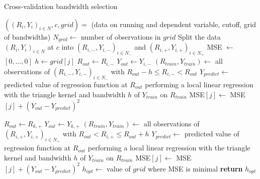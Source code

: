 \documentclass[11pt, a4paper, leqno]{article}
\begin{document}
\begin{algorithm}
	\caption{Cross-validation bandwidth selection}\label{alg:cv}
	\begin{algorithmic}[1]
		\Require $((R_{i}, Y_{i})_{i \in N}, c, grid) =$ (data on running and dependent variable, cutoff, grid of bandwidths)
		\State $N_{grid} \gets$ number of observations in $grid$
		\State Split the data $(R_{i}, Y_{i})_{i \in N}$ at $c$ into $(R_{i, -}, Y_{i, -})_{i \in N_{-}}$ and $(R_{i, +}, Y_{i, +})_{i \in N_{+}}$
		\State MSE $\gets$ $\left[ 0, \dots, 0 \right]$
		\State $h \gets grid[j]$
		\State $R_{out} \gets R_{i, -}$
		\State $Y_{out} \gets Y_{i, -}$
		\State $\left(R_{train}, Y_{train}\right) \gets$ all observations of $(R_{i, -}, Y_{i, -})_{i \in N_{-}}$ with $R_{out}-h \leq R_{i, -} < R_{out}$
		\State $Y_{predict} \gets$ predicted value of regression function at $R_{out}$ performing a local linear \newline
		\mbox{} regression with the triangle kernel and bandwidth $h$ of $Y_{train}$ on $R_{train}$
		\State MSE$[j] \gets$ MSE$[j] + \left( Y_{out} - Y_{predict} \right)^{2}$
		\EndFor

		\State $R_{out} \gets R_{k, +}$
		\State $Y_{out} \gets Y_{k, +}$
		\State $\left(R_{train}, Y_{train}\right) \gets$ all observations of  $(R_{i, +}, Y_{i, +})_{i \in N_{+}}$ with $R_{out} < R_{i, +} \leq R_{out}+h $
		\State $Y_{predict} \gets$ predicted value of regression function at $R_{out}$ performing a local linear \newline
		\mbox{} regression with the triangle kernel and bandwidth $h$ of $Y_{train}$ on $R_{train}$
		\State MSE$[j] \gets$ MSE$[j] + \left( Y_{out} - Y_{predict} \right)^{2}$
		\EndFor
		\EndFor
		\State $h_{opt} \gets$ value of $grid$ where MSE is minimal
		\State \textbf{return} $h_{opt}$
	\end{algorithmic}
\end{algorithm}
\end{document}
